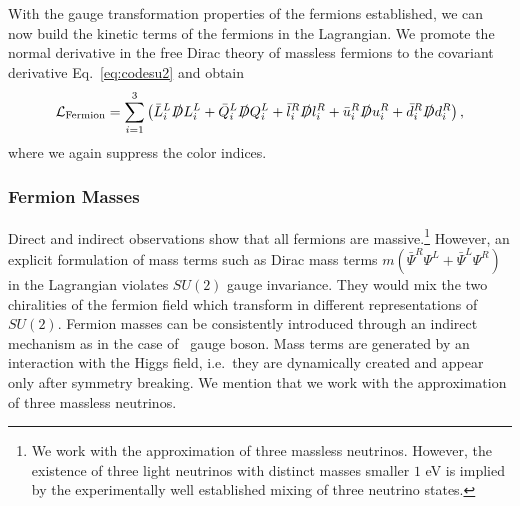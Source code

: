 \endgroup
With the gauge transformation properties of the fermions established,
we can now build the kinetic terms of the fermions in the
Lagrangian. We promote the normal derivative in the free Dirac theory of
massless fermions to the covariant derivative
Eq.~\eqref{eq:codesu2} and obtain
\begin{align}\label{eq:fermlag}
  \mathcal{L}_{\text{Fermion}} = \sum_{i=1}^3\left( \bar{L}_i^L
    \slashed{D}L_i^L + \bar{Q}_i^L \slashed{D}Q_i^L + \bar{l}_i^R
    \slashed{D}l_i^R + \bar{u}_i^R \slashed{D}u_i^R + \bar{d}_i^R \slashed{D}d_i^R \right),
\end{align}
where we again suppress the color indices. 

\subsubsection{Fermion Masses}
\label{sec:fermmass}
Direct and indirect observations show that all fermions are
massive.\footnote{We work with
the approximation of three massless neutrinos. However, the existence of three
  light neutrinos with distinct masses smaller $1$ eV is implied by
  the experimentally well established mixing of three neutrino states.} However, an explicit
formulation of mass terms such as Dirac mass terms $m \left(\bar{\Psi}^R
  \Psi^L + \bar{\Psi}^L
  \Psi^R \right)$ in the Lagrangian violates $SU(2)$ gauge
invariance. They would mix the two chiralities of the fermion
field which transform in different representations of $SU(2)$. Fermion masses can be consistently introduced through an indirect mechanism as in the
case of \ew~gauge boson. Mass terms are generated by an
interaction with the Higgs field, i.e.\ they are dynamically created
and appear only after symmetry breaking. We mention that we work with
the approximation of three massless neutrinos.


